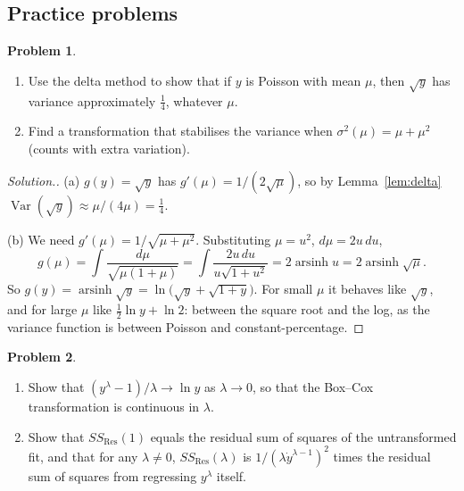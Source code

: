 \documentclass[11pt,a4paper]{article}
\numberwithin{equation}{section}
\theoremstyle{definition}
\newtheorem{problemx}{Problem}[subsection]
\newenvironment{problem}{\begin{problemx}}{\end{problemx}}
\newenvironment{solution}
  {\renewcommand{\qedsymbol}{}\begin{proof}[\textit{Solution}.]}
  {\end{proof}}
\begin{document}
\subsection{Practice problems}
\begin{problem}\label{prob:delta-poisson}
\begin{enumerate}[label=(\alph*)]
\item Use the delta method to show that if $y$ is Poisson with mean $\mu$, then $\sqrt{y}$ has
variance approximately $\frac14$, whatever $\mu$.
\item Find a transformation that stabilises the variance when $\sigma^2(\mu) = \mu + \mu^2$
(counts with extra variation).
\end{enumerate}
\end{problem}

\begin{solution}
(a) $g(y) = \sqrt y$ has $g'(\mu) = 1/(2\sqrt\mu)$, so by Lemma~\ref{lem:delta}
$\operatorname{Var}(\sqrt y) \approx \mu/(4\mu) = \frac14$.

(b) We need $g'(\mu) = 1/\sqrt{\mu + \mu^2}$. Substituting $\mu = u^2$, $d\mu = 2u\,du$,
\[
g(\mu) = \int\frac{d\mu}{\sqrt{\mu(1 + \mu)}} = \int\frac{2u\,du}{u\sqrt{1 + u^2}} = 2\operatorname{arsinh}u = 2\operatorname{arsinh}\sqrt\mu .
\]
So $g(y) = \operatorname{arsinh}\sqrt{y} = \ln\bigl(\sqrt y + \sqrt{1 + y}\bigr)$. For small $\mu$ it
behaves like $\sqrt y$, and for large $\mu$ like $\frac12\ln y + \ln 2$: between the square root and
the log, as the variance function is between Poisson and constant-percentage.
\end{solution}

\begin{problem}\label{prob:boxcox-limit}
\begin{enumerate}[label=(\alph*)]
\item Show that $(y^\lambda - 1)/\lambda \to \ln y$ as $\lambda \to 0$, so that the Box--Cox
transformation is continuous in $\lambda$.
\item Show that $SS_{\mathrm{Res}}(1)$ equals the residual sum of squares of the
untransformed fit,
and that for any $\lambda \neq 0$, $SS_{\mathrm{Res}}(\lambda)$ is $1/(\lambda\dot y^{\lambda - 1})^2$ times the
residual sum of squares from regressing $y^\lambda$ itself.
\end{enumerate}
\end{problem}
\end{document}

